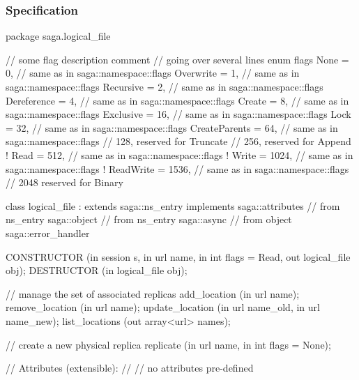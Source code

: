  \subsubsection{Specification}
 
 \begin{myspec}
  package saga.logical_file
  {
    // some flag description comment
    // going over several lines
    enum flags
    {
      None            =    0, // same as in saga::namespace::flags
      Overwrite       =    1, // same as in saga::namespace::flags
      Recursive       =    2, // same as in saga::namespace::flags
      Dereference     =    4, // same as in saga::namespace::flags
      Create          =    8, // same as in saga::namespace::flags
      Exclusive       =   16, // same as in saga::namespace::flags
      Lock            =   32, // same as in saga::namespace::flags
      CreateParents   =   64, // same as in saga::namespace::flags
      //                 128,    reserved for Truncate
      //                 256,    reserved for Append
!     Read            =  512, // same as in saga::namespace::flags 
!     Write           = 1024, // same as in saga::namespace::flags 
!     ReadWrite       = 1536, // same as in saga::namespace::flags 
      //                2048     reserved for Binary
    }
 
 
    class logical_file : extends        saga::ns_entry
                         implements     saga::attributes
                      // from ns_entry  saga::object
                      // from ns_entry  saga::async
                      // from object    saga::error_handler
    {
      CONSTRUCTOR     (in  session             s,
                       in  url                 name,
                       in  int                 flags = Read,
                       out logical_file        obj);
      DESTRUCTOR      (in  logical_file        obj);
 
 
      // manage the set of associated replicas
      add_location    (in  url                 name);
      remove_location (in  url                 name);
      update_location (in  url                 name_old,
                       in  url                 name_new);
      list_locations  (out array<url>          names);
 
      // create a new physical replica
      replicate       (in  url                 name, 
                       in  int                 flags = None);
 
      // Attributes (extensible):
      // 
      // no attributes pre-defined
    }
 
}
\end{myspec}
